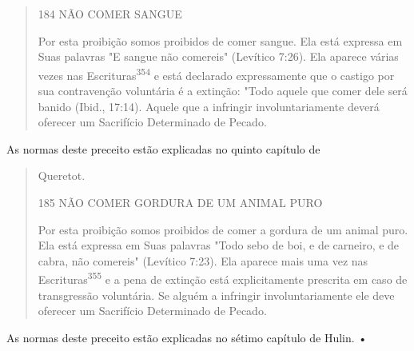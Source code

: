 \begin{quote}
184 NÃO COMER SANGUE

Por esta proibição somos proibidos de comer sangue. Ela está ex­pressa
em Suas palavras "E sangue não comereis" (Levítico 7:26). Ela aparece
várias vezes nas Escrituras\textsuperscript{354} e está declarado
expressamente que o castigo por sua contravenção voluntária é a
extinção: "Todo aquele que comer dele será banido (Ibid., 17:14). Aquele
que a infringir involuntariamente deverá oferecer um Sacrifício
Determinado de Pecado.
\end{quote}

As normas deste preceito estão explicadas no quinto capítulo de

\begin{quote}
Queretot.

185 NÃO COMER GORDURA DE UM ANIMAL PURO

Por esta proibição somos proibidos de comer a gordura de um ani­mal
puro. Ela está expressa em Suas palavras "Todo sebo de boi, e de
carneiro, e de cabra, não comereis" (Levítico 7:23). Ela aparece mais
uma vez nas Escrituras\textsuperscript{355} e a pena de extinção está
explicitamente prescrita em caso de transgressão voluntária. Se alguém a
infringir involuntariamente ele deve ofe­recer um Sacrifício Determinado
de Pecado.
\end{quote}

As normas deste preceito estão explicadas no sétimo capítulo de Hulin. •

